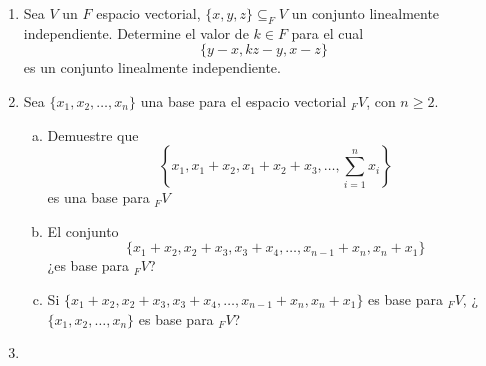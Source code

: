 \documentclass{article}
\begin{document}
\begin{enumerate}
        \item {
            Sea $V$ un $F$ espacio vectorial, $\{x,y,z\}\subseteq_{F}V$ un conjunto linealmente independiente. Determine el valor de $k\in F$ para el cual $$\{y-x,kz-y,x-z\}$$ es un conjunto linealmente independiente.
        }

        \item Sea $\{x_1,x_2,\ldots,x_n\}$ una base para el espacio vectorial $_{F}V$, con $n\geq 2$.
        \begin{enumerate}[a.]
            \item {
                Demuestre que $$\left\{x_1,x_1+x_2,x_1+x_2+x_3,\ldots,\sum_{i=1}^{n}{x_i}\right\}$$ es una base para $_{F}V$
            }
            \item {
                El conjunto $$\{x_1+x_2,x_2+x_3,x_3+x_4,\ldots,x_{n-1}+x_n,x_n+x_1\}$$ ¿es base para $_{F}V$?
            }
            \item {
                Si $\{x_1+x_2,x_2+x_3,x_3+x_4,\ldots,x_{n-1}+x_n,x_n+x_1\}$ es base para $_{F}V$, ¿$\{x_1,x_2,\ldots,x_n\}$ es base para $_{F}V$?
            }
        \end{enumerate}

        \item 
    \end{enumerate}
\end{document}
